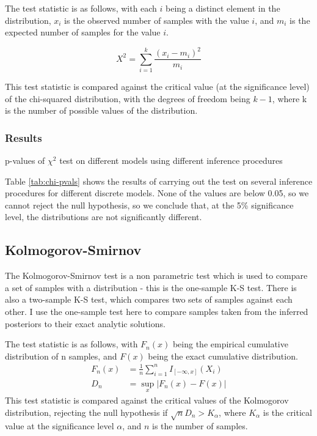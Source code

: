 The test statistic is as follows, with each $i$ being a distinct element in the distribution, $x_i$ is the observed number of samples with the value $i$, and $m_i$ is the expected number of samples for the value $i$.

$$X^{2}=\sum _{i=1}^{k}{\frac {(x_{i}-m_{i})^{2}}{m_{i}}}$$

This test statistic is compared against the critical value (at the significance level) of the chi-squared distribution, with the degrees of freedom being $k-1$, where k is the number of possible values of the distribution.
\subsubsection{Results}
\begin{table}[!ht]
	\centering
	\caption{p-values of $\chi^2$ test on different models using different inference procedures}
	\label{tab:chi-pvals}
\end{table}

Table \ref{tab:chi-pvals} shows the results of carrying out the test on several inference procedures for different discrete models. None of the values are below 0.05, so we cannot reject the null hypothesis, so we conclude that, at the 5\% significance level, the distributions are not significantly different.

\subsection{Kolmogorov-Smirnov}

The Kolmogorov-Smirnov test is a non parametric test which is used to compare a set of samples with a distribution - this is the one-sample K-S test. There is also a two-sample K-S test, which compares two sets of samples against each other. I use the one-sample test here to compare samples taken from the inferred posteriors to their exact analytic solutions.

The test statistic is as follows, with $F_n(x)$ being the empirical cumulative distribution of n samples, and $F(x)$ being the exact cumulative distribution.
\begin{align*}
	F_{n}(x) & =\frac{1}{n}\sum_{i=1}^{n}I_{[-\infty ,x]}(X_{i}) \\
	D_{n}    & =\sup_{x}|F_{n}(x)-F(x)|                          
\end{align*}
This test statistic is compared against the critical values of the Kolmogorov distribution, rejecting the null hypothesis if $\sqrt{n}D_n > K_\alpha$, where $K_\alpha$ is the critical value at the significance level $\alpha$, and $n$ is the number of samples.

